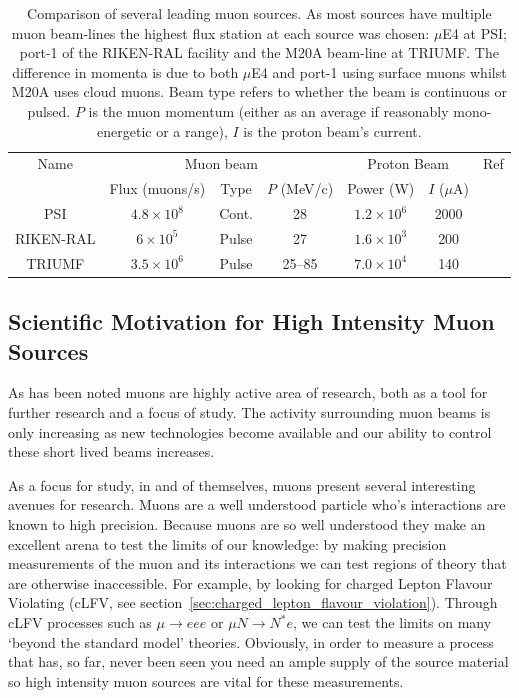 \begin{table}[htpb]
  \begin{center}
  \begin{tabular}{c | c | c | c | c | c | c}
    Name       &  \multicolumn{3}{c|}{Muon beam}                 &  \multicolumn{2}{c|}{Proton Beam}  &   Ref \\
               &  Flux (muons/s)     &  Type  & \( P \) (MeV/c)  &  Power (W)    & \(I\) (\(\mu\)A)   &       \\
    \hline    
    PSI        &  \(4.8\times10^8\)  &  Cont.  &  28  &  \(1.2\times10^6\)  &  2000  &  \cite{mue4_psi}   \\ 
    RIKEN-RAL  &  \(6\times10^5\)    &  Pulse  &  27  &  \(1.6\times10^3\)  &  200   &  \cite{riken_ral}       \\
    TRIUMF     &  \(3.5\times10^6\)  &  Pulse  &  25--85  &  \(7.0\times10^4\)  &  140   &  \cite{triumf_m20a} \\
  \end{tabular}
  \end{center}
  \caption{Comparison of several leading muon sources. As most sources have multiple muon beam-lines the highest flux station at each source was chosen: \(\mu\)E4 at PSI; port-1 of the RIKEN-RAL facility and the M20A beam-line at TRIUMF. The difference in momenta is due to both \(\mu\)E4 and port-1 using surface muons whilst M20A uses cloud muons. Beam type refers to whether the beam is continuous or pulsed. \( P \) is the muon momentum (either as an average if reasonably mono-energetic or a range), \( I \) is the proton beam's current.}
  \label{tab:cf_muon_sources}
\end{table}


\subsection{Scientific Motivation for High Intensity Muon Sources} %
\label{sec:scientific_motivation_for_high_intenstity_muon_sources}
As has been noted muons are highly active area of research, both as a tool for further research and a focus of study. The activity surrounding muon beams is only increasing as new technologies become available and our ability to control these short lived beams increases. 

As a focus for study, in and of themselves, muons present several interesting avenues for research. Muons are a well understood particle who's interactions are known to high precision. Because muons are so well understood they make an excellent arena to test the limits of our knowledge: by making precision measurements of the muon and its interactions we can test regions of theory that are otherwise inaccessible. For example, by looking for charged Lepton Flavour Violating (cLFV, see section~\ref{sec:charged_lepton_flavour_violation}). Through cLFV processes such as \( \mu\rightarrow eee \) or \( \mu N \rightarrow N^* e \), we can test the limits on many `beyond the standard model' theories. Obviously, in order to measure a process that has, so far, never been seen you need an ample supply of the source material so high intensity muon sources are vital for these measurements.


